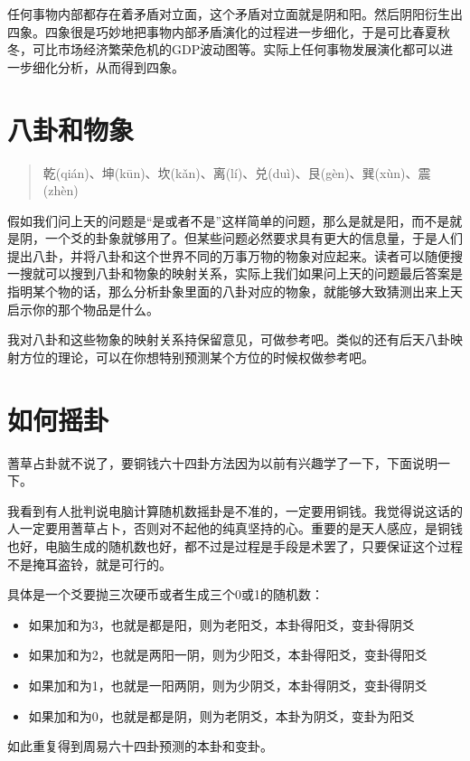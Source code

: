\documentclass[12pt,oneside]{book}
\begin{document}
任何事物内部都存在着矛盾对立面，这个矛盾对立面就是阴和阳。然后阴阳衍生出四象。四象很是巧妙地把事物内部矛盾演化的过程进一步细化，于是可比春夏秋冬，可比市场经济繁荣危机的GDP波动图等。实际上任何事物发展演化都可以进一步细化分析，从而得到四象。

\section{八卦和物象}
\begin{quote}
乾(qián)、坤(kūn)、坎(kǎn)、离(lí)、兑(duì)、艮(gèn)、巽(xùn)、震(zhèn)
\end{quote}


假如我们问上天的问题是“是或者不是”这样简单的问题，那么是就是阳，而不是就是阴，一个爻的卦象就够用了。但某些问题必然要求具有更大的信息量，于是人们提出八卦，并将八卦和这个世界不同的万事万物的物象对应起来。读者可以随便搜一搜就可以搜到八卦和物象的映射关系，实际上我们如果问上天的问题最后答案是指明某个物的话，那么分析卦象里面的八卦对应的物象，就能够大致猜测出来上天启示你的那个物品是什么。

我对八卦和这些物象的映射关系持保留意见，可做参考吧。类似的还有后天八卦映射方位的理论，可以在你想特别预测某个方位的时候权做参考吧。



\section{如何摇卦}
蓍草占卦就不说了，要铜钱六十四卦方法因为以前有兴趣学了一下，下面说明一下。

我看到有人批判说电脑计算随机数摇卦是不准的，一定要用铜钱。我觉得说这话的人一定要用蓍草占卜，否则对不起他的纯真坚持的心。重要的是天人感应，是铜钱也好，电脑生成的随机数也好，都不过是过程是手段是术罢了，只要保证这个过程不是掩耳盗铃，就是可行的。

具体是一个爻要抛三次硬币或者生成三个0或1的随机数：

\begin{itemize}
\item 如果加和为3，也就是都是阳，则为老阳爻，本卦得阳爻，变卦得阴爻
\item 如果加和为2，也就是两阳一阴，则为少阳爻，本卦得阳爻，变卦得阳爻
\item 如果加和为1，也就是一阳两阴，则为少阴爻，本卦得阴爻，变卦得阴爻
\item 如果加和为0，也就是都是阴，则为老阴爻，本卦为阴爻，变卦为阳爻
\end{itemize}


如此重复得到周易六十四卦预测的本卦和变卦。
\end{document}
